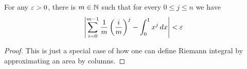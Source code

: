 \documentclass{article}
\begin{document}
\begin{lemma}
\label{lem:approximate}
    For any $\varepsilon > 0$, there is $m \in \mathbb{N}$ such that for every $0 \le j \le n$ we have
    \begin{align}
    \label{eq:approximate}
        \left|\sum_{i = 0}^{m-1}  \frac{1}{m}  \left( \frac{i}{m} \right)^j 
        -
        \int_0^1 x^j \,dx
        \right|
        < \varepsilon
    \end{align}
\end{lemma}
\begin{proof}
This is just a special case of how one can define Riemann integral by approximating an area by columns. 
\end{proof}
\end{document}
